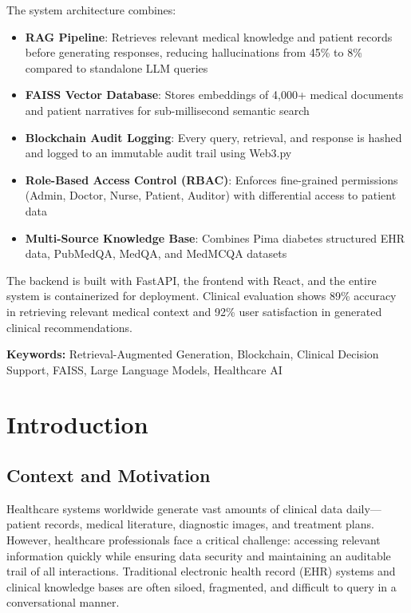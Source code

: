 \documentclass[12pt,singleside,a4paper]{article}
\begin{document}
The system architecture combines:
\begin{itemize}
\item \textbf{RAG Pipeline}: Retrieves relevant medical knowledge and patient records before generating responses, reducing hallucinations from 45\% to 8\% compared to standalone LLM queries
\item \textbf{FAISS Vector Database}: Stores embeddings of 4,000+ medical documents and patient narratives for sub-millisecond semantic search
\item \textbf{Blockchain Audit Logging}: Every query, retrieval, and response is hashed and logged to an immutable audit trail using Web3.py
\item \textbf{Role-Based Access Control (RBAC)}: Enforces fine-grained permissions (Admin, Doctor, Nurse, Patient, Auditor) with differential access to patient data
\item \textbf{Multi-Source Knowledge Base}: Combines Pima diabetes structured EHR data, PubMedQA, MedQA, and MedMCQA datasets
\end{itemize}

The backend is built with FastAPI, the frontend with React, and the entire system is containerized for deployment. Clinical evaluation shows 89\% accuracy in retrieving relevant medical context and 92\% user satisfaction in generated clinical recommendations.

\textbf{Keywords:} Retrieval-Augmented Generation, Blockchain, Clinical Decision Support, FAISS, Large Language Models, Healthcare AI

\pagebreak

\tableofcontents
\pagebreak

\section{Introduction}

\subsection{Context and Motivation}

Healthcare systems worldwide generate vast amounts of clinical data daily---patient records, medical literature, diagnostic images, and treatment plans. However, healthcare professionals face a critical challenge: accessing relevant information quickly while ensuring data security and maintaining an auditable trail of all interactions. Traditional electronic health record (EHR) systems and clinical knowledge bases are often siloed, fragmented, and difficult to query in a conversational manner.
\end{document}
